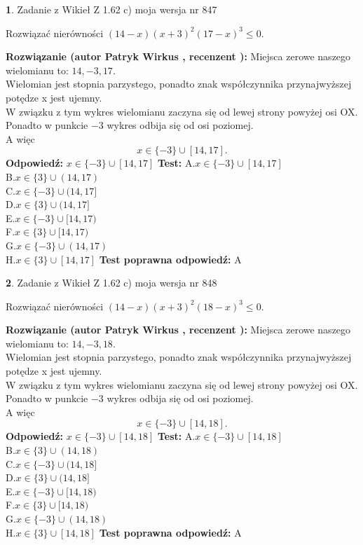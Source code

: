 \documentclass[12pt, a4paper]{article}
\theoremstyle{definition} %
\newtheorem{zad}{}
\newcommand{\zadStart}[1]{\begin{zad}#1\newline}
\newcommand{\zadStop}{\end{zad}}
\newcommand{\rozwStart}[2]{\noindent \textbf{Rozwiązanie (autor #1 , recenzent #2): }\newline}
\newcommand{\rozwStop}{\newline}
\newcommand{\odpStart}{\noindent \textbf{Odpowiedź:}\newline}
\newcommand{\odpStop}{\newline}
\newcommand{\testStart}{\noindent \textbf{Test:}\newline}
\newcommand{\testStop}{\newline}
\newcommand{\kluczStart}{\noindent \textbf{Test poprawna odpowiedź:}\newline}
\newcommand{\kluczStop}{\newline}
\begin{document}
\zadStart{Zadanie z Wikieł Z 1.62 c) moja wersja nr 847}

Rozwiązać nierówności $(14-x)(x+3)^{2}(17-x)^{3}\le0$.
\zadStop
\rozwStart{Patryk Wirkus}{}
Miejsca zerowe naszego wielomianu to: $14, -3, 17$.\\
Wielomian jest stopnia parzystego, ponadto znak współczynnika przy\linebreak najwyższej potędze x jest ujemny.\\ W związku z tym wykres wielomianu zaczyna się od lewej strony powyżej osi OX.\\
Ponadto w punkcie $-3$ wykres odbija się od osi poziomej.\\
A więc $$x \in \{-3\} \cup [14,17].$$
\rozwStop
\odpStart
$x \in \{-3\} \cup [14,17]$
\odpStop
\testStart
A.$x \in \{-3\} \cup [14,17]$\\
B.$x \in \{3\} \cup (14,17)$\\
C.$x \in \{-3\} \cup (14,17]$\\
D.$x \in \{3\} \cup (14,17]$\\
E.$x \in \{-3\} \cup [14,17)$\\
F.$x \in \{3\} \cup [14,17)$\\
G.$x \in \{-3\} \cup (14,17)$\\
H.$x \in \{3\} \cup [14,17]$
\testStop
\kluczStart
A
\kluczStop



\zadStart{Zadanie z Wikieł Z 1.62 c) moja wersja nr 848}

Rozwiązać nierówności $(14-x)(x+3)^{2}(18-x)^{3}\le0$.
\zadStop
\rozwStart{Patryk Wirkus}{}
Miejsca zerowe naszego wielomianu to: $14, -3, 18$.\\
Wielomian jest stopnia parzystego, ponadto znak współczynnika przy\linebreak najwyższej potędze x jest ujemny.\\ W związku z tym wykres wielomianu zaczyna się od lewej strony powyżej osi OX.\\
Ponadto w punkcie $-3$ wykres odbija się od osi poziomej.\\
A więc $$x \in \{-3\} \cup [14,18].$$
\rozwStop
\odpStart
$x \in \{-3\} \cup [14,18]$
\odpStop
\testStart
A.$x \in \{-3\} \cup [14,18]$\\
B.$x \in \{3\} \cup (14,18)$\\
C.$x \in \{-3\} \cup (14,18]$\\
D.$x \in \{3\} \cup (14,18]$\\
E.$x \in \{-3\} \cup [14,18)$\\
F.$x \in \{3\} \cup [14,18)$\\
G.$x \in \{-3\} \cup (14,18)$\\
H.$x \in \{3\} \cup [14,18]$
\testStop
\kluczStart
A
\kluczStop
\end{document}
